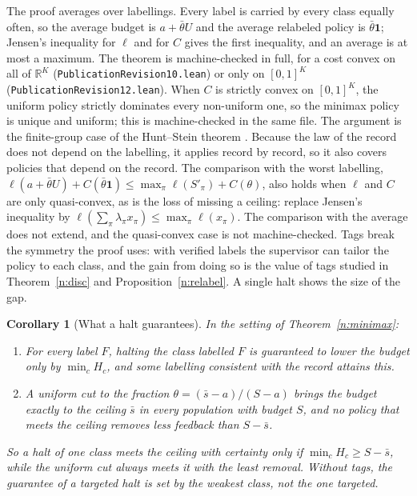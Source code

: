 \documentclass[12pt]{article}
\newtheorem{corollary}[theorem]{Corollary}
\theoremstyle{definition}
\theoremstyle{remark}
\begin{document}
The proof averages over labellings. Every label is carried by every class equally often, so the average budget is $a+\bar\theta U$ and the average relabeled policy is $\bar\theta\mathbf 1$; Jensen's inequality for $\ell$ and for $C$ gives the first inequality, and an average is at most a maximum. The theorem is machine-checked in full, for a cost convex on all of $\mathbb R^K$ (\nolinkurl{PublicationRevision10.lean}) or only on $[0,1]^K$ (\nolinkurl{PublicationRevision12.lean}). When $C$ is strictly convex on $[0,1]^K$, the uniform policy strictly dominates every non-uniform one, so the minimax policy is unique and uniform; this is machine-checked in the same file. The argument is the finite-group case of the Hunt--Stein theorem \citep[Chapter~8]{lehmann2005}. Because the law of the record does not depend on the labelling, it applies record by record, so it also covers policies that depend on the record. The comparison with the worst labelling, $\ell(a+\bar\theta U)+C(\bar\theta\mathbf 1)\le\max_\pi\ell(S'_\pi)+C(\theta)$, also holds when $\ell$ and $C$ are only quasi-convex, as is the loss of missing a ceiling: replace Jensen's inequality by $\ell(\sum_\pi\lambda_\pi x_\pi)\le\max_\pi\ell(x_\pi)$. The comparison with the average does not extend, and the quasi-convex case is not machine-checked. Tags break the symmetry the proof uses: with verified labels the supervisor can tailor the policy to each class, and the gain from doing so is the value of tags studied in Theorem~\ref{n:disc} and Proposition~\ref{n:relabel}. A single halt shows the size of the gap.

\begin{corollary}[What a halt guarantees]\label{cor:robustuniform}
In the setting of Theorem~\ref{n:minimax}:
\begin{enumerate}[label=(\roman*),itemsep=1pt]
\item For every label $F$, halting the class labelled $F$ is guaranteed to lower the budget only by $\min_cH_c$, and some labelling consistent with the record attains this.
\item A uniform cut to the fraction $\theta=(\bar s-a)/(S-a)$ brings the budget exactly to the ceiling $\bar s$ in every population with budget $S$, and no policy that meets the ceiling removes less feedback than $S-\bar s$.
\end{enumerate}
So a halt of one class meets the ceiling with certainty only if $\min_cH_c\ge S-\bar s$, while the uniform cut always meets it with the least removal. Without tags, the guarantee of a targeted halt is set by the weakest class, not the one targeted.
\end{corollary}
\end{document}
